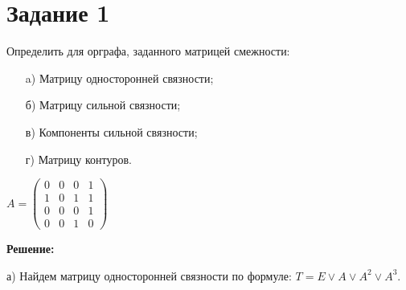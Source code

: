 \section*{Задание 1}
Определить для орграфа, заданного матрицей смежности:
\begin{enumerate}
\item[a)]Матрицу односторонней связности;
\item[б)]Матрицу сильной связности;
\item[в)]Компоненты сильной связности;
\item[г)]Матрицу контуров.
\end{enumerate}

$A = \begin{pmatrix}0 & 0 & 0 & 1 \\1 & 0 & 1 & 1\\0 & 0 & 0 & 1\\0 & 0 & 1 & 0\end{pmatrix}$

\vspace{\baselineskip}

{\large\textbf{Решение:}}

\vspace{\baselineskip}

а) Найдем матрицу односторонней связности по формуле: $T=E\vee A \vee A^2 \vee A^3$.

